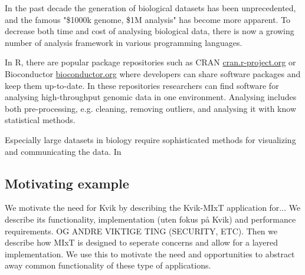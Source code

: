 

In the past decade the generation of biological datasets has been unprecedented,
and the famous "\$1000k genome, \$1M analysis"\cite{} has become more apparent.
To decrease both time and cost of analysing biological data, there is now a
growing number of analysis framework in various programming languages. \cite{}

In R, there are popular package repositories such as CRAN
\url{cran.r-project.org} or Bioconductor \url{bioconductor.org} where developers
can share software packages and keep them up-to-date. In these repositories
researchers can find software for analysing high-throughput genomic data in one
environment. Analysing includes both pre-processing, e.g. cleaning, removing
outliers, and analysing it with know statistical methods.

Especially large datasets in biology require sophisticated methods for
visualizing and communicating the data. In



\subsection*{Motivating example}


We motivate the need for Kvik by describing the Kvik-MIxT application for... We
describe its functionality, implementation (uten fokus på Kvik) and performance
requirements. OG ANDRE VIKTIGE TING (SECURITY, ETC). Then we describe how MIxT
is designed to seperate concerns and allow for a layered implementation. We use
this to motivate the need and opportunities to abstract away common
functionality of these type of applications.

